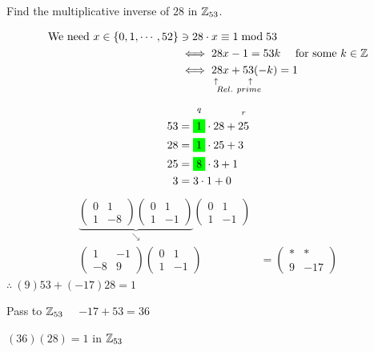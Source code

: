 \begin{example}
    Find the multiplicative inverse of $28$ in ${\mathbb{ Z}}_{53}$. \\ \steezybreak
    
    \begin{align}
        \text{We need } x\in \{0,1,\cdots, 52\} &\ni 28\cdot x \equiv 1 \bmod 53 \nonumber \\
        &\iff 28x-1=53k \ \ \ \text{     for some }k\in {\mathbb{ Z}} \nonumber \\
        &\iff \underset{\substack{\uparrow \ \ \ \ \ \ \ \  \uparrow \ \ \ \ \ \ \\ Rel. \ prime \ \ \ }}{28x+53(-k)}=1 \nonumber
    \end{align}

    \begin{align}
        53&= \overset{\substack{q \\ \ }}{\colorbox{green}{1}}\cdot 28 + \overset{\substack{r \\ \ }}{25} \nonumber \\
        28&= \colorbox{green}{1}\cdot 25 + 3 \nonumber \\
        25&= \colorbox{green}{8}\cdot 3 + 1 \nonumber \\
        3&= 3 \cdot 1 + 0 \nonumber
    \end{align}
    \begin{align}
        \underbrace{\begin{pmatrix}
            0&1 \\
            1 & -8
        \end{pmatrix}
        \begin{pmatrix}
            0&1 \\
            1 & -1
        \end{pmatrix}}_{\searrow}
        \begin{pmatrix}
            0&1 \\
            1 & -1
        \end{pmatrix}& \nonumber \\
        \begin{pmatrix}
            1&-1 \\
            -8 & 9
        \end{pmatrix}
        \begin{pmatrix}
            0&1 \\
            1 & -1
        \end{pmatrix}&= \begin{pmatrix}
            *&* \\
            9 & -17
        \end{pmatrix} \nonumber
    \end{align}
    $\therefore \ (9)53+(-17)28 = 1$ \\ \steezybreak
    
    \noindent Pass to ${\mathbb{ Z}}_{53}$ \ \ $-17+53=36$ \\ \steezybreak
    
    \noindent $(36)(28)=1$ in ${\mathbb{ Z}}_{53}$
\end{example} 
\newpage 


